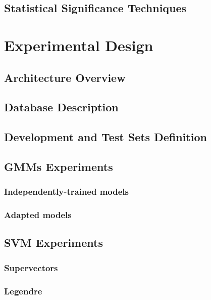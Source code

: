 \documentclass[11pt,a4paper]{tesis}
\begin{document}
	\section{Statistical Significance Techniques}
		
		

\chapter{Experimental Design}
	\section{Architecture Overview}
		
	\section{Database Description}
	\section{Development and Test Sets Definition}
	\section{GMMs Experiments}
		\subsection{Independently-trained models}
		\subsection{Adapted models}
	\section{SVM Experiments}
		\subsection{Supervectors}
		\subsection{Legendre}
			
\end{document}

